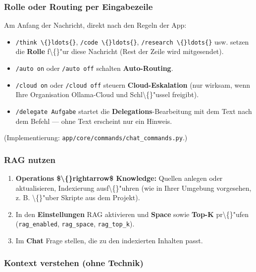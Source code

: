 \subsubsection{Rolle oder Routing per Eingabezeile}

Am Anfang der Nachricht, direkt nach den Regeln der App:

\begin{itemize}
\item \texttt{/think \textbackslash\{\}ldots\{\}}, \texttt{/code \textbackslash\{\}ldots\{\}}, \texttt{/research \textbackslash\{\}ldots\{\}} usw. setzen die \textbf{Rolle} f\textbackslash\{\}"ur diese Nachricht (Rest der Zeile wird mitgesendet).
\item \texttt{/auto on} oder \texttt{/auto off} schalten \textbf{Auto-Routing}.
\item \texttt{/cloud on} oder \texttt{/cloud off} steuern \textbf{Cloud-Eskalation} (nur wirksam, wenn Ihre Organisation Ollama-Cloud und Schl\textbackslash\{\}"ussel freigibt).
\item \texttt{/delegate Aufgabe} startet die \textbf{Delegations}-Bearbeitung mit dem Text nach dem Befehl --- ohne Text erscheint nur ein Hinweis.
\end{itemize}

(Implementierung: \texttt{app/core/commands/chat\_commands.py}.)

\subsubsection{RAG nutzen}

\begin{enumerate}
\item \textbf{Operations \$\textbackslash\{\}rightarrow\$ Knowledge:} Quellen anlegen oder aktualisieren, Indexierung ausf\textbackslash\{\}"uhren (wie in Ihrer Umgebung vorgesehen, z. B. \textbackslash\{\}"uber Skripte aus dem Projekt).
\item In den \textbf{Einstellungen} RAG aktivieren und \textbf{Space} sowie \textbf{Top-K} pr\textbackslash\{\}"ufen (\texttt{rag\_enabled}, \texttt{rag\_space}, \texttt{rag\_top\_k}).
\item Im \textbf{Chat} Frage stellen, die zu den indexierten Inhalten passt.
\end{enumerate}

\subsubsection{Kontext verstehen (ohne Technik)}

